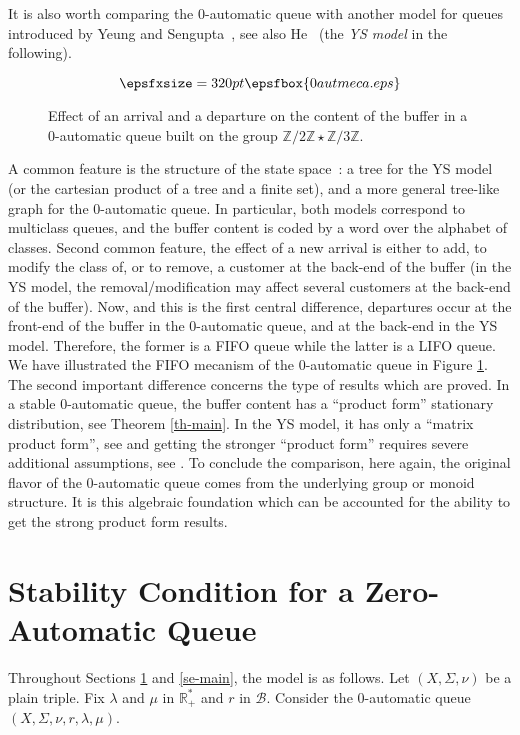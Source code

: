 \documentclass[11pt,a4paper]{article}
\theoremstyle{remark}
\def\Blackboardfont{\mathbb}
\def\cb{\cB}
\def\Z{{\Blackboardfont Z}}
\def\R{{\Blackboardfont R}}
\def\cB{{\mathcal B}}
\begin{document}
\medskip

It is also worth comparing the 0-automatic queue with another model for
queues introduced by Yeung and Sengupta~\cite{YeSe}, see also
He~\cite{he} (the {\em YS model} in the following). 

\begin{figure}[ht]
\[ \epsfxsize=320pt \epsfbox{0autmeca.eps} \]
\caption{Effect of an arrival and a departure on the content of the
  buffer in a 0-automatic queue built on the group $\Z/2\Z\star \Z/3\Z$.}
\label{fi-0autmeca}
\end{figure}

A common feature is the structure of the state space~: a tree for the
YS model (or the cartesian product of a tree and a finite set), and a
more general tree-like graph for the 0-automatic queue. In particular,
both models correspond to multiclass queues, and the buffer content is
coded by a word over the alphabet of classes. Second common
feature, the effect of a new arrival is either to add, to modify
the class of, or to remove, a customer at the back-end of the buffer (in
the YS model, the removal/modification may affect several customers at
the back-end of the buffer). Now, and this is the first central
difference, departures occur at the front-end of the buffer in the
0-automatic queue, and at the back-end in the YS model. Therefore, the
former is a FIFO queue while the latter is a LIFO queue. We have
illustrated the FIFO mecanism of the 0-automatic queue in Figure
\ref{fi-0autmeca}. 
The second important difference concerns the type of results which are
proved. In a stable 0-automatic queue, the buffer content has a
``product form'' stationary distribution, see Theorem \ref{th-main}. In the YS
model, it has only a  ``matrix product form'', see \cite[Section 2]{YeSe} and getting the
stronger ``product form'' requires severe additional assumptions, see 
\cite[Section 6]{YeSe}. 
To conclude the comparison, here again, the original flavor of the
0-automatic queue comes from the underlying group or monoid structure. It is
this algebraic foundation which can be accounted for the ability 
to get the strong product form results. 

\section{Stability Condition for a Zero-Automatic Queue}
\label{se-stab}

Throughout Sections \ref{se-stab} and \ref{se-main}, the model is
as follows. Let $(X,\Sigma,\nu)$ be a plain triple. Fix $\lambda$
and $\mu$ in $\R_+^*$ and $r$ in $\cb$. Consider the 0-automatic
queue $(X,\Sigma,\nu,r,\lambda,\mu)$.
\end{document}
